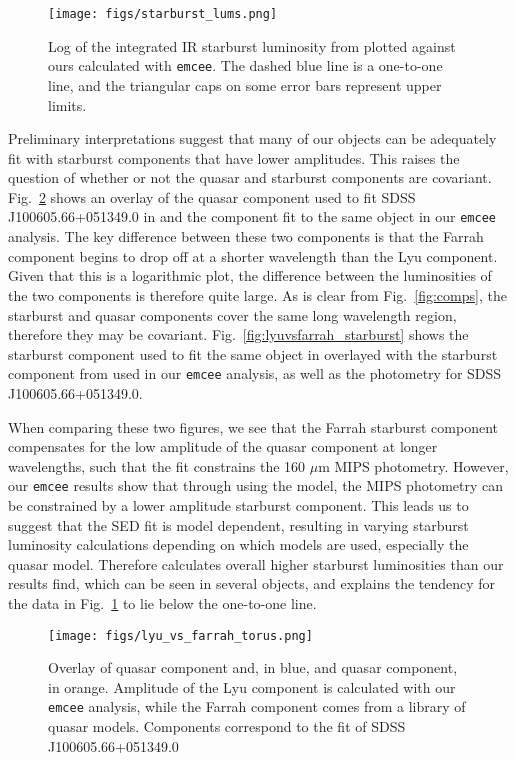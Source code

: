\begin{figure}
  \centering
  \texttt{[image: figs/starburst\_lums.png]}
  \caption{Log of the integrated IR starburst luminosity from \cite{farrah2012} plotted against ours calculated with \texttt{emcee}. 
           The dashed blue line is a one-to-one line, and the triangular caps on some error bars represent upper limits.}
           \label{fig:starlum}
\end{figure}

Preliminary interpretations suggest that many of our objects can be adequately fit with starburst components that 
have lower amplitudes. This raises the question of whether or not the quasar and starburst components are covariant. 
Fig.~\ref{fig:lyuvsfarrah_torus} shows an overlay of the quasar component used to fit SDSS J100605.66+051349.0 in \cite{farrah2012} 
and the component fit to the same object in our \texttt{emcee} analysis. The key difference between these two components is that 
the Farrah component begins to drop off at a shorter wavelength than the Lyu component. Given that this is a logarithmic plot, 
the difference between the luminosities of the two components is therefore quite large. As is clear from Fig.~\ref{fig:comps}, 
the starburst and quasar components cover the same long wavelength region, therefore they may be covariant. 
Fig.~\ref{fig:lyuvsfarrah_starburst} shows the starburst component used to fit the same object in \cite{farrah2012} overlayed 
with the starburst component from \cite{dalehelou2002} used in our \texttt{emcee} analysis, as well as the photometry for 
SDSS J100605.66+051349.0. 

When comparing these two figures, we see that the Farrah starburst component compensates for 
the low amplitude of the quasar component at longer wavelengths, such that the fit constrains the 160 $\mu$m MIPS 
photometry. However, our \texttt{emcee} results show that through using the \cite{lyu2017feb} model, the MIPS 
photometry can be constrained by a lower amplitude starburst component. This leads us to suggest that the SED fit 
is model dependent, resulting in varying starburst luminosity calculations depending on which models are used, especially 
the quasar model. Therefore \cite{farrah2012} calculates overall higher starburst luminosities than our results 
find, which can be seen in several objects, and explains the tendency for the data in Fig.~\ref{fig:starlum} to 
lie below the one-to-one line.

\begin{figure}
  \centering
  \texttt{[image: figs/lyu\_vs\_farrah\_torus.png]}
  \caption{Overlay of \cite{farrah2012} quasar component and, in blue, and \cite{lyu2017feb} quasar component, in orange. 
           Amplitude of the Lyu component is calculated with our \texttt{emcee} analysis, while the Farrah component 
           comes from a library of quasar models. Components correspond to the fit of SDSS J100605.66+051349.0}
           \label{fig:lyuvsfarrah_torus}
\end{figure}

